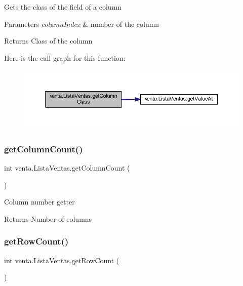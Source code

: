 Gets the class of the field of a column 
\begin{DoxyParams}{Parameters}
{\em column\+Index} & number of the column \\
\hline
\end{DoxyParams}
\begin{DoxyReturn}{Returns}
Class of the column 
\end{DoxyReturn}
Here is the call graph for this function\+:
\nopagebreak
\begin{figure}[H]
\begin{center}
\leavevmode
\includegraphics[width=350pt]{classventa_1_1_lista_ventas_a285fad7c683f620c9320ee9d430975bd_cgraph}
\end{center}
\end{figure}
\mbox{\label{classventa_1_1_lista_ventas_a4c846805ce96ed90b2dc1228a2fc82c7}} 
\subsubsection{\texorpdfstring{get\+Column\+Count()}{getColumnCount()}}
{\footnotesize\ttfamily int venta.\+Lista\+Ventas.\+get\+Column\+Count (\begin{DoxyParamCaption}{ }\end{DoxyParamCaption})}

Column number getter \begin{DoxyReturn}{Returns}
Number of columns 
\end{DoxyReturn}
\mbox{\label{classventa_1_1_lista_ventas_a6c9b22b51a3571a01462073c6272cf0b}} 
\subsubsection{\texorpdfstring{get\+Row\+Count()}{getRowCount()}}
{\footnotesize\ttfamily int venta.\+Lista\+Ventas.\+get\+Row\+Count (\begin{DoxyParamCaption}{ }\end{DoxyParamCaption})}

